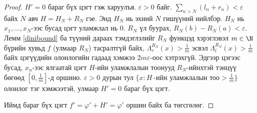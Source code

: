\begin{proof}
$H'=0$ бараг бүх цэгт гэж харуулъя. $\varepsilon>0$ байг. $\sum_{n>N}(l_n+r_n)<\varepsilon$ байх $N$ авч $H=H_N+R_N$ гэе. Энд $H_N$ нь эхний $N$ гишүүний нийлбэр. $H_N$ нь $x_1,\ldots,x_N$-ээс бусад цэгт уламжлал нь $0$. $R_N$ үл буурах, $R_N(b)-R_N(a)<\varepsilon$. Лемм \ref{dinibound} ба түүний дараах тэмдэглэлийг $R_N$ функцэд хэрэглэвэл $m\in\N$ бүрийн хувьд $f$ (улмаар $R_N$) тасралтгүй байх, $\Lambda_r^{R_N}(x)>\frac1m$ эсвэл $\Lambda_l^{R_N}(x)>\frac1m$ байх цэгүүдийн олонлогийн гадаад хэмжээ $2m\varepsilon$-оос хэтрэхгүй. Эдгээр цэгээс бусад, $x_n$-ээс ялгаатай цэгт $H$-ийн уламжлалын тоонууд $R_N$-ийнхтэй тэнцүү бөгөөд $[0,\frac1m]$-д оршино. $\varepsilon>0$ дурын тул $\{x: H\ \mbox{-ийн уламжлалын тоо}>\frac1m\}$ олонлог тэг хэмжээтэй, улмаар $H'=0$ бараг бүх цэгт.

Иймд бараг бүх цэгт $f'=\varphi'+H'=\varphi'$ оршин байх ба төгсгөлөг.
\end{proof}
